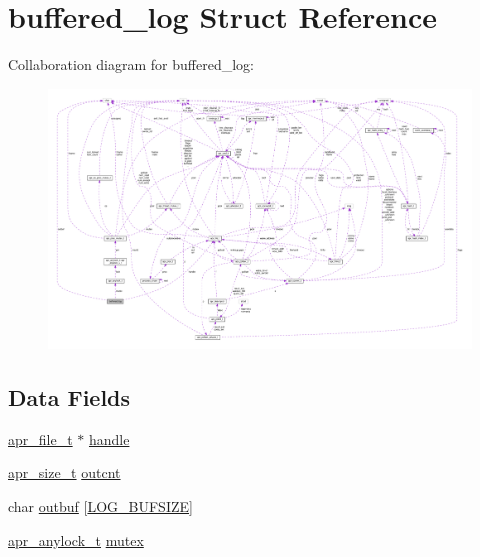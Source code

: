 \hypertarget{structbuffered__log}{}\section{buffered\+\_\+log Struct Reference}
\label{structbuffered__log}


Collaboration diagram for buffered\+\_\+log\+:
\nopagebreak
\begin{figure}[H]
\begin{center}
\leavevmode
\includegraphics[width=350pt]{structbuffered__log__coll__graph}
\end{center}
\end{figure}
\subsection*{Data Fields}
\begin{DoxyCompactItemize}
\item 
\hyperlink{structapr__file__t}{apr\+\_\+file\+\_\+t} $\ast$ \hyperlink{structbuffered__log_ad832e24fb2ab71c284d2990b97a6261b}{handle}
\item 
\hyperlink{group__apr__platform_gaaa72b2253f6f3032cefea5712a27540e}{apr\+\_\+size\+\_\+t} \hyperlink{structbuffered__log_aa9b93cc6ac85532dd23ac91172a37725}{outcnt}
\item 
char \hyperlink{structbuffered__log_a5051094a6d504ac181c9b8228281b502}{outbuf} \mbox{[}\hyperlink{mod__log__config_8c_a6067e0aa5354f77cf9ca95180c5fc2db}{L\+O\+G\+\_\+\+B\+U\+F\+S\+I\+ZE}\mbox{]}
\item 
\hyperlink{structapr__anylock__t}{apr\+\_\+anylock\+\_\+t} \hyperlink{structbuffered__log_ab16638515d5e0d49bdbe6b7b35ce66d1}{mutex}
\end{DoxyCompactItemize}



